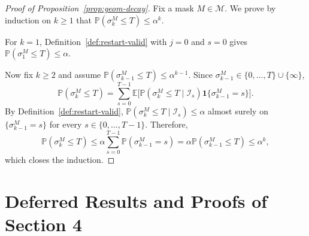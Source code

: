 \documentclass{uai2026} %
\newcommand{\1}{\mathbf{1}}
\newcommand{\ind}[1]{\mathbf{1}\{#1\}}
\newcommand{\prob}{\mathbb{P}}
\newcommand{\expec}{\mathbb{E}}
\newcommand{\err}{\mathrm{err}}
\newcommand{\mcal}{\mathcal{M}}
\newcommand{\acal}{\mathcal{A}}
\begin{document}
\begin{proof}[Proof of Proposition~\ref{prop:geom-decay}]
  Fix a mask $M\in\mcal$.
  We prove by induction on $k\ge 1$ that $\prob(\sigma_k^{M}\le T)\le \alpha^k$.

  For $k=1$, Definition~\ref{def:restart-valid} with $j=0$ and $s=0$ gives $\prob(\sigma_1^{M}\le T)\le \alpha$.

  Now fix $k\ge 2$ and assume $\prob(\sigma_{k-1}^{M}\le T)\le \alpha^{k-1}$.
  Since $\sigma_{k-1}^{M}\in\{0,\dots,T\}\cup\{\infty\}$,
  \begin{equation*}
    \prob(\sigma_k^{M}\le T)
    =\sum_{s=0}^{T-1}\expec\Big[\prob(\sigma_k^{M}\le T \mid \mathcal{I}_s)\ind{\sigma_{k-1}^{M}=s}\Big].
  \end{equation*}
  By Definition~\ref{def:restart-valid},
  $\prob(\sigma_k^{M}\le T \mid \mathcal{I}_s)\le \alpha$
  almost surely on $\{\sigma_{k-1}^{M}=s\}$ for every $s\in\{0,\dots,T-1\}$.
  Therefore,
  \begin{equation*}
    \prob(\sigma_k^{M}\le T)
    \le \alpha\sum_{s=0}^{T-1}\prob(\sigma_{k-1}^{M}=s)
    = \alpha\prob(\sigma_{k-1}^{M}\le T)
    \le \alpha^k,
  \end{equation*}
  which closes the induction.
\end{proof}\par\medskip

\section{Deferred Results and Proofs of Section 4}
\label{app:proofs_4}

\end{document}
